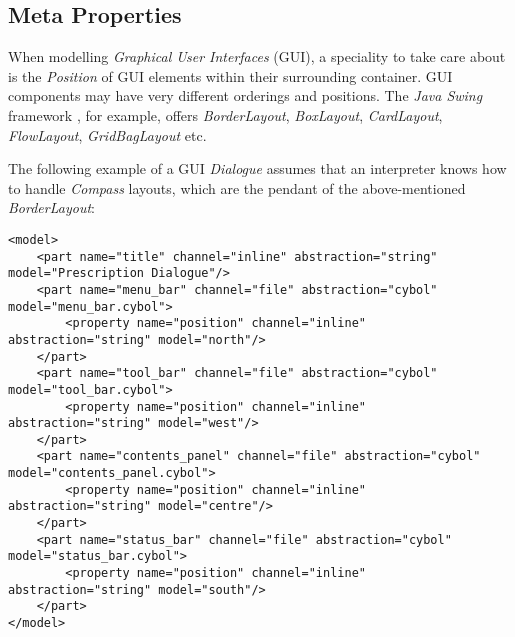 %
%
%
%
%
%

\subsection{Meta Properties}
\label{meta_properties_heading}

When modelling \emph{Graphical User Interfaces} (GUI), a speciality to take
care about is the \emph{Position} of GUI elements within their surrounding
container. GUI components may have very different orderings and positions. The
\emph{Java Swing} framework \cite{java}, for example, offers \emph{BorderLayout},
\emph{BoxLayout}, \emph{CardLayout}, \emph{FlowLayout}, \emph{GridBagLayout} etc.

The following example of a GUI \emph{Dialogue} assumes that an interpreter
knows how to handle \emph{Compass} layouts, which are the pendant of the
above-mentioned \emph{BorderLayout}:

\begin{scriptsize}
    \begin{verbatim}
<model>
    <part name="title" channel="inline" abstraction="string" model="Prescription Dialogue"/>
    <part name="menu_bar" channel="file" abstraction="cybol" model="menu_bar.cybol">
        <property name="position" channel="inline" abstraction="string" model="north"/>
    </part>
    <part name="tool_bar" channel="file" abstraction="cybol" model="tool_bar.cybol">
        <property name="position" channel="inline" abstraction="string" model="west"/>
    </part>
    <part name="contents_panel" channel="file" abstraction="cybol" model="contents_panel.cybol">
        <property name="position" channel="inline" abstraction="string" model="centre"/>
    </part>
    <part name="status_bar" channel="file" abstraction="cybol" model="status_bar.cybol">
        <property name="position" channel="inline" abstraction="string" model="south"/>
    </part>
</model>
    \end{verbatim}
\end{scriptsize}

